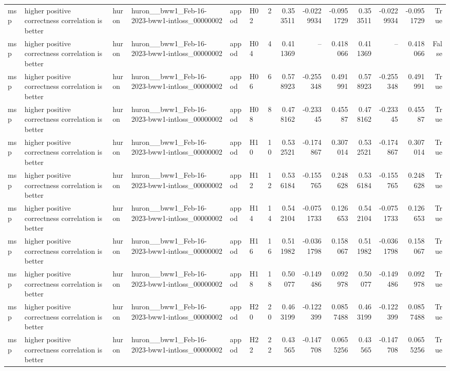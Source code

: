 \begin{longtable}{llllllrrrrrrrr}
msp & higher positive correctness correlation is better & huron & huron\_\_bww1\_Feb-16-2023-bww1-intloss\_00000002 & appod & H02 & 2 & 0.353511 & -0.0229934 & -0.0951729 & 0.353511 & -0.0229934 & -0.0951729 & True \\
msp & higher positive correctness correlation is better & huron & huron\_\_bww1\_Feb-16-2023-bww1-intloss\_00000002 & appod & H04 & 4 & 0.411369 & -- & 0.418066 & 0.411369 & -- & 0.418066 & False \\
msp & higher positive correctness correlation is better & huron & huron\_\_bww1\_Feb-16-2023-bww1-intloss\_00000002 & appod & H06 & 6 & 0.578923 & -0.255348 & 0.491991 & 0.578923 & -0.255348 & 0.491991 & True \\
msp & higher positive correctness correlation is better & huron & huron\_\_bww1\_Feb-16-2023-bww1-intloss\_00000002 & appod & H08 & 8 & 0.478162 & -0.23345 & 0.45587 & 0.478162 & -0.23345 & 0.45587 & True \\
msp & higher positive correctness correlation is better & huron & huron\_\_bww1\_Feb-16-2023-bww1-intloss\_00000002 & appod & H10 & 10 & 0.532521 & -0.174867 & 0.307014 & 0.532521 & -0.174867 & 0.307014 & True \\
msp & higher positive correctness correlation is better & huron & huron\_\_bww1\_Feb-16-2023-bww1-intloss\_00000002 & appod & H12 & 12 & 0.536184 & -0.155765 & 0.248628 & 0.536184 & -0.155765 & 0.248628 & True \\
msp & higher positive correctness correlation is better & huron & huron\_\_bww1\_Feb-16-2023-bww1-intloss\_00000002 & appod & H14 & 14 & 0.542104 & -0.0751733 & 0.126653 & 0.542104 & -0.0751733 & 0.126653 & True \\
msp & higher positive correctness correlation is better & huron & huron\_\_bww1\_Feb-16-2023-bww1-intloss\_00000002 & appod & H16 & 16 & 0.511982 & -0.0361798 & 0.158067 & 0.511982 & -0.0361798 & 0.158067 & True \\
msp & higher positive correctness correlation is better & huron & huron\_\_bww1\_Feb-16-2023-bww1-intloss\_00000002 & appod & H18 & 18 & 0.50077 & -0.149486 & 0.092978 & 0.50077 & -0.149486 & 0.092978 & True \\
msp & higher positive correctness correlation is better & huron & huron\_\_bww1\_Feb-16-2023-bww1-intloss\_00000002 & appod & H20 & 20 & 0.463199 & -0.122399 & 0.0857488 & 0.463199 & -0.122399 & 0.0857488 & True \\
msp & higher positive correctness correlation is better & huron & huron\_\_bww1\_Feb-16-2023-bww1-intloss\_00000002 & appod & H22 & 22 & 0.43565 & -0.147708 & 0.0655256 & 0.43565 & -0.147708 & 0.0655256 & True \\

\end{longtable}
